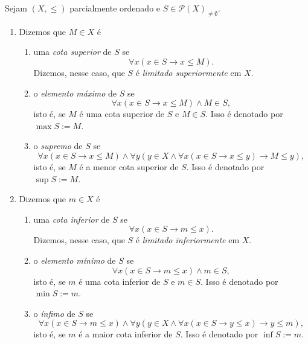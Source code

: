 \begin{definition}
    Sejam $(X, \leq)$ parcialmente ordenado e $S \in \mathcal{P}(X)_{\neq \emptyset}$.
        \begin{enumerate}[leftmargin=*, align=left, label=\textbf{(\alph*)}]
            \item Dizemos que $M \in X$ é
                \begin{enumerate}[label=\roman*.]
                    \item uma \emph{cota superior} de $S$ se
                        \[
                            \forall x (x \in S \rightarrow x \leq M).
                        \]
                    Dizemos, nesse caso, que $S$ é \emph{limitado superiormente} em $X$.
                    \item o \emph{elemento máximo} de $S$ se
                        \[
                            \forall x (x \in S \rightarrow x \leq M) \land M \in S,
                        \]
                    isto é, se $M$ é uma cota superior de $S$ e $M \in S$. Isso é denotado por $\max{S} := M$.
                    \item o \emph{supremo} de $S$ se
                        \[
                            \forall x (x \in S \rightarrow x \leq M) \land \forall y (y \in X \land \forall x (x \in S \rightarrow x \leq y) \rightarrow M \leq y),
                        \]
                    isto é, se $M$ é a menor cota superior de $S$. Isso é denotado por $\sup{S} := M$.
                \end{enumerate}
            \item Dizemos que $m \in X$ é
                \begin{enumerate}[label=\roman*.]
                    \item uma \emph{cota inferior} de $S$ se
                        \[
                            \forall x (x \in S \rightarrow m \leq x).
                        \]
                    Dizemos, nesse caso, que $S$ é \emph{limitado inferiormente} em $X$.
                    \item o \emph{elemento mínimo} de $S$ se
                        \[
                            \forall x (x \in S \rightarrow m \leq x) \land m \in S,
                        \]
                    isto é, se $m$ é uma cota inferior de $S$ e $m \in S$. Isso é denotado por $\min{S} := m$.
                    \item o \emph{ínfimo} de $S$ se
                        \[
                            \forall x (x \in S \rightarrow m \leq x) \land \forall y (y \in X \land \forall x (x \in S \rightarrow y \leq x) \rightarrow y \leq m),
                        \]
                    isto é, se $m$ é a maior cota inferior de $S$. Isso é denotado por $\inf{S} := m$.
                \end{enumerate}
        \end{enumerate}
\end{definition}

